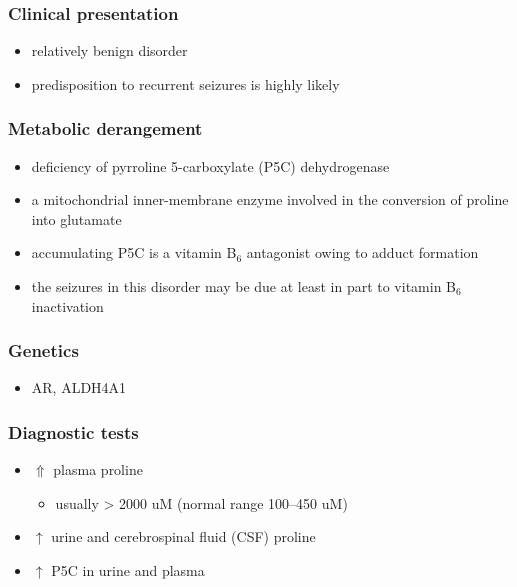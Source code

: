 \documentclass{scrartcl}
\begin{document}
\subsubsection{Clinical presentation}
\label{sec:org20a6f16}
\begin{itemize}
\item relatively benign disorder
\item predisposition to recurrent seizures is highly likely
\end{itemize}
\subsubsection{Metabolic derangement}
\label{sec:org89d989f}
\begin{itemize}
\item deficiency of pyrroline 5-carboxylate (P5C) dehydrogenase
\item a mitochondrial inner-membrane enzyme involved in the conversion of
proline into glutamate
\end{itemize}
\begin{itemize}
\item accumulating P5C is a vitamin B\(_{\text{6}}\) antagonist owing to adduct
formation
\item the seizures in this disorder may be due at least in part to vitamin
B\(_{\text{6}}\) inactivation
\end{itemize}


\subsubsection{Genetics}
\label{sec:org8dee5ff}
\begin{itemize}
\item AR, ALDH4A1
\end{itemize}

\subsubsection{Diagnostic tests}
\label{sec:org71a5493}
\begin{itemize}
\item \(\Uparrow\) plasma proline
\begin{itemize}
\item usually \textgreater{} 2000 uM (normal range 100–450 uM)
\end{itemize}
\item \(\uparrow\) urine and cerebrospinal fluid (CSF) proline
\item \(\uparrow\) P5C in urine and plasma
\end{itemize}
\end{document}
